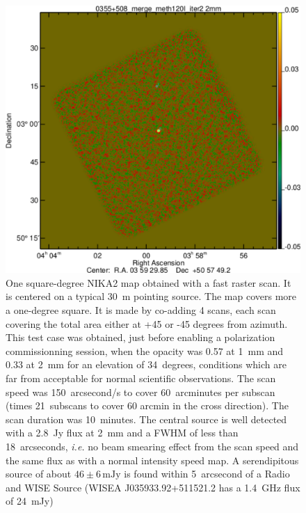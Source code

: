 \documentclass[10pt,a4paper,twoside,graphicx,color]{article}
\begin{document}


\begin{figure}
  \begin{center}
   \includegraphics[width=0.3\columnwidth]{./Figures/0355+508_merge_meth120I_iter2_source_detect2mmCrop.pdf}
  \end{center}
\caption{One square-degree NIKA2 map obtained with a fast raster
  scan. It is centered on a typical 30~m pointing source.  The map
  covers more a one-degree square. It is made by co-adding 4 scans,
  each scan covering the total area either at +45 or -45 degrees from
  azimuth. This test case was obtained, just before enabling a
  polarization commissionning session, when the opacity was 0.57 at
  1~mm and 0.33 at 2~mm for an elevation of 34~degrees, conditions
  which are far from acceptable for normal scientific
  observations. The scan speed was 150~arcsecond/s to cover
  60~arcminutes per subscan (times 21~subscans to cover 60 arcmin in
  the cross direction). The scan duration was 10~minutes. The central
  source is well detected with a 2.8~Jy flux at 2~mm and a FWHM of
  less than 18~arcseconds, {\sl i.e.} no beam smearing effect from the
  scan speed and the same flux as with a normal intensity speed map. A
  serendipitous source of about $46\pm6\,\mathrm{mJy}$ is found within
  5~arcsecond of a Radio and WISE Source (WISEA J035933.92+511521.2
  has a 1.4~GHz flux of 24~mJy)}
\label{Fig:1sqdegMap}

\end{figure}
\end{document}
